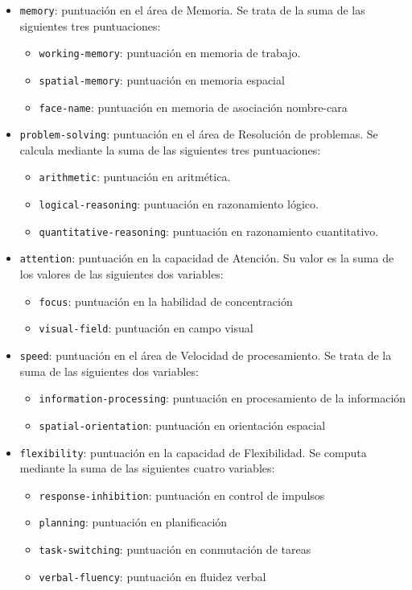 \begin{itemize}
\item {\tt memory}: puntuación en el área de Memoria. Se trata de la suma de las siguientes tres puntuaciones:
  \begin{itemize}
  \item {\tt working-memory}: puntuación en memoria de trabajo.
  \item {\tt spatial-memory}: puntuación en memoria espacial
  \item {\tt face-name}: puntuación en memoria de asociación nombre-cara
  \end{itemize}
\item {\tt problem-solving}: puntuación en el área de Resolución de problemas. Se calcula mediante la suma de las siguientes tres puntuaciones:
  \begin{itemize}
  \item {\tt arithmetic}: puntuación en aritmética.
  \item {\tt logical-reasoning}: puntuación en razonamiento lógico.
  \item {\tt quantitative-reasoning}: puntuación en razonamiento cuantitativo.
  \end{itemize}
\item {\tt attention}: puntuación en la capacidad de Atención. Su valor es la suma de los valores de las siguientes dos variables:
  \begin{itemize}
  \item {\tt focus}: puntuación en la habilidad de concentración
  \item {\tt visual-field}: puntuación en campo visual
  \end{itemize}
\item {\tt speed}: puntuación en el área de Velocidad de procesamiento. Se trata de la suma de las siguientes dos variables:
  \begin{itemize}
  \item {\tt information-processing}: puntuación en procesamiento de la información
  \item {\tt spatial-orientation}: puntuación en orientación espacial
  \end{itemize}
\item {\tt flexibility}: puntuación en la capacidad de Flexibilidad. Se computa mediante la suma de las siguientes cuatro variables:
  \begin{itemize}
  \item {\tt response-inhibition}: puntuación en control de impulsos
  \item {\tt planning}: puntuación en planificación
  \item {\tt task-switching}: puntuación en conmutación de tareas
  \item {\tt verbal-fluency}: puntuación en fluidez verbal
  \end{itemize}
\end{itemize}

